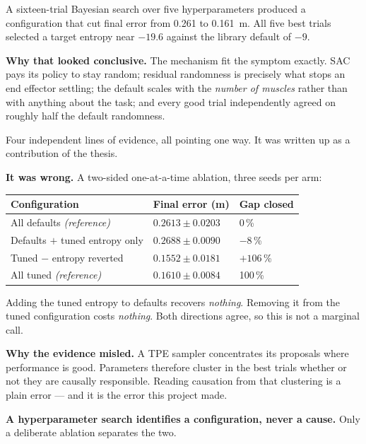 A sixteen-trial Bayesian search over five hyperparameters produced a
configuration that cut final error from \SI{0.261}{} to \SI{0.161}{\meter}. All
five best trials selected a target entropy near $-19.6$ against the library
default of $-9$.

\begin{why}
\textbf{Why that looked conclusive.} The mechanism fit the symptom exactly. SAC
pays its policy to stay random; residual randomness is precisely what stops an
end effector settling; the default scales with the \emph{number of muscles}
rather than with anything about the task; and every good trial independently
agreed on roughly half the default randomness.

Four independent lines of evidence, all pointing one way. It was written up as a
contribution of the thesis.
\end{why}

\begin{trap}
\textbf{It was wrong.} A two-sided one-at-a-time ablation, three seeds per arm:

\begin{center}
\begin{tabular}{@{} L{7.6cm} C{3.2cm} C{2.4cm} @{}}
\toprule
\textbf{Configuration} & \textbf{Final error (m)} & \textbf{Gap closed} \\
\midrule
All defaults \emph{(reference)} & $0.2613 \pm 0.0203$ & 0\,\% \\
Defaults $+$ tuned entropy only & $0.2688 \pm 0.0090$ & $-8$\,\% \\
Tuned $-$ entropy reverted & $0.1552 \pm 0.0181$ & $+106$\,\% \\
All tuned \emph{(reference)} & $0.1610 \pm 0.0084$ & 100\,\% \\
\bottomrule
\end{tabular}
\end{center}

Adding the tuned entropy to defaults recovers \emph{nothing}. Removing it from
the tuned configuration costs \emph{nothing}. Both directions agree, so this is
not a marginal call.

\textbf{Why the evidence misled.} A TPE sampler concentrates its proposals where
performance is good. Parameters therefore cluster in the best trials whether or
not they are causally responsible. Reading causation from that clustering is a
plain error --- and it is the error this project made.

\textbf{A hyperparameter search identifies a configuration, never a cause.} Only
a deliberate ablation separates the two.
\end{trap}

